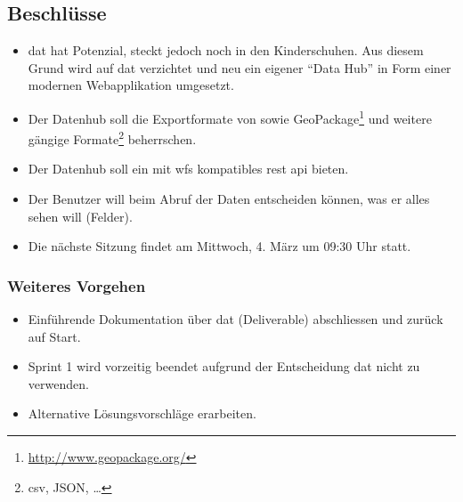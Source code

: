 \documentclass[class=scrbook,crop=false]{standalone}
\begin{document}
	\subsection*{Beschlüsse}
	\begin{itemize}
		\item \gls{dat} hat Potenzial, steckt jedoch noch in den Kinderschuhen. Aus diesem Grund wird auf \gls{dat} verzichtet und neu ein eigener ``Data Hub'' in Form einer modernen Webapplikation umgesetzt.
		\item Der Datenhub soll die Exportformate von  sowie GeoPackage\footnote{\url{http://www.geopackage.org/}} und weitere gängige Formate\footnote{\acs{csv}, JSON, \dots} beherrschen.
		\item Der Datenhub soll ein mit \gls{wfs} kompatibles \acs{rest} \acs{api} bieten.
		\item Der Benutzer will beim Abruf der Daten entscheiden können, was er alles sehen will (Felder).
		\item Die nächste Sitzung findet am Mittwoch, 4. März um 09:30 Uhr statt.
	\end{itemize}
	
	\subsubsection*{Weiteres Vorgehen}
	\begin{itemize}
		\item Einführende Dokumentation über \gls{dat} (Deliverable) abschliessen und zurück auf Start.
		\item Sprint 1 wird vorzeitig beendet aufgrund der Entscheidung \gls{dat} nicht zu verwenden.
		\item Alternative Lösungsvorschläge erarbeiten.
	\end{itemize}
	
\end{document}
